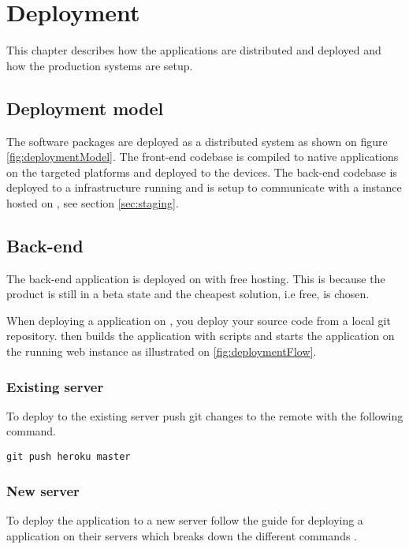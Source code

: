 \chapter{Deployment}
This chapter describes how the applications are distributed and deployed and how the production systems are setup.

\section{Deployment model}
The software packages are deployed as a distributed system as shown on figure \ref{fig:deploymentModel}.
The front-end codebase is compiled to native applications on the targeted platforms and deployed to the devices.
The back-end codebase is deployed to a  infrastructure running  and is setup to communicate with a  instance hosted on , see section \ref{sec:staging}.


\section{Back-end}
The back-end application is deployed on  with free hosting. 
This is because the product is still in a beta state and the cheapest solution, i.e free, is chosen.

When deploying a  application on , you deploy your source code from a local git repository.
 then builds the application with  scripts and starts the application on the running web instance as illustrated on \ref{fig:deploymentFlow}.


\subsection{Existing server}
To deploy to the existing server push git changes to the  remote with the following command.

\verb+git push heroku master+

\subsection{New server}
To deploy the application to a new server follow the  guide for deploying a  application on their servers which breaks down the different commands \citep{documentation:deployment:heroku}.

